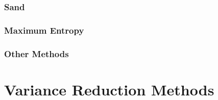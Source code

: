 
\subsubsection{Sand}


\subsubsection{Maximum Entropy}



\subsubsection{Other Methods}


\section{Variance Reduction Methods}


